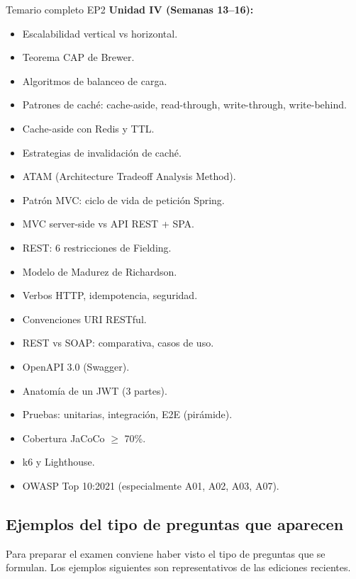 \begin{cajaadvertencia}{Temario completo EP2}
\textbf{Unidad IV (Semanas 13--16):}
\begin{itemize}
\item Escalabilidad vertical vs horizontal.
\item Teorema CAP de Brewer.
\item Algoritmos de balanceo de carga.
\item Patrones de caché: cache-aside, read-through, write-through,
write-behind.
\item Cache-aside con Redis y TTL.
\item Estrategias de invalidación de caché.
\item ATAM (Architecture Tradeoff Analysis Method).
\item Patrón MVC: ciclo de vida de petición Spring.
\item MVC server-side vs API REST + SPA.
\item REST: 6 restricciones de Fielding.
\item Modelo de Madurez de Richardson.
\item Verbos HTTP, idempotencia, seguridad.
\item Convenciones URI RESTful.
\item REST vs SOAP: comparativa, casos de uso.
\item OpenAPI 3.0 (Swagger).
\item Anatomía de un JWT (3 partes).
\item Pruebas: unitarias, integración, E2E (pirámide).
\item Cobertura JaCoCo $\geq$ 70\%.
\item k6 y Lighthouse.
\item OWASP Top 10:2021 (especialmente A01, A02, A03, A07).
\end{itemize}
\end{cajaadvertencia}

\subsection{Ejemplos del tipo de preguntas que aparecen}

Para preparar el examen conviene haber visto el tipo de
preguntas que se formulan. Los ejemplos siguientes son
representativos de las ediciones recientes.


